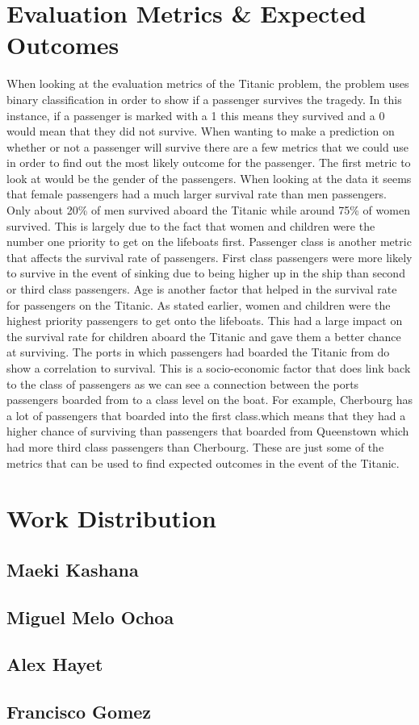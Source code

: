 \documentclass{APA}
\begin{document}
\section{Evaluation Metrics \& Expected Outcomes}
	When looking at the evaluation metrics of the Titanic problem, the problem uses binary classification in order to show if a passenger survives the tragedy. In this instance, if a passenger is marked with a 1 this means they survived and a 0 would mean that they did not survive. When wanting to make a prediction on whether or not a passenger will survive there are a few metrics that we could use in order to find out the most likely outcome for the passenger.
	The first metric to look at would be the gender of the passengers. When looking at the data it seems that female passengers had a much larger survival rate than men passengers. Only about 20\% of men survived aboard the Titanic while around 75\% of women survived. This is largely due to the fact that women and children were the number one priority to get on the lifeboats first. Passenger class is another metric that affects the survival rate of passengers. First class passengers were more likely to survive in the event of sinking due to being higher up in the ship than second or third class passengers. Age is another factor that helped in the survival rate for passengers on the Titanic. As stated earlier, women and children were the highest priority passengers to get onto the lifeboats. This had a large impact on the survival rate for children aboard the Titanic and gave them a better chance at surviving. The ports in which passengers had boarded the Titanic from do show a correlation to survival. This is a socio-economic factor that does link back to the class of passengers as we can see a connection between the ports passengers boarded from to a class level on the boat. For example, Cherbourg has a lot of passengers that boarded into the first class.which means that they had a higher chance of surviving than passengers that boarded from Queenstown which had more third class passengers than Cherbourg. These are just some of the metrics that can be used to find expected outcomes in the event of the Titanic.

\newpage



\section{Work Distribution}

\subsection{Maeki Kashana}

\subsection{Miguel Melo Ochoa}

\subsection{Alex Hayet}

\subsection{Francisco Gomez}

\printbibliography
\end{document}
